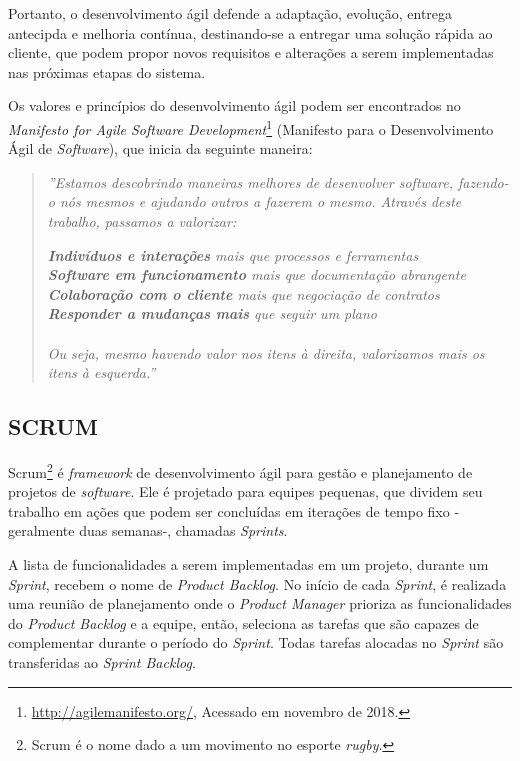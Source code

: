 Portanto, o desenvolvimento ágil defende a adaptação, evolução, entrega antecipda e melhoria contínua, destinando-se a entregar uma solução rápida ao cliente, que podem propor novos requisitos e alterações a serem implementadas nas próximas etapas do sistema.

Os valores e princípios do desenvolvimento ágil podem ser encontrados no \textit{Manifesto for Agile Software Development}\footnote{\url{http://agilemanifesto.org/}, Acessado em novembro de 2018.} (Manifesto para o Desenvolvimento Ágil de \textit{Software}), que inicia da seguinte maneira:

\begin{quote}
    \textit{''Estamos descobrindo maneiras melhores de desenvolver software, fazendo-o nós mesmos e ajudando outros a 
    fazerem o mesmo. Através deste trabalho, passamos a valorizar:}
    
        \textit{\textbf{Indivíduos e interações} mais que processos e ferramentas \\
        \textbf{Software em funcionamento} mais que documentação abrangente \\
        \textbf{Colaboração com o cliente} mais que negociação de contratos \\
        \textbf{Responder a mudanças mais} que seguir um plano \\}
        \\
        \textit{Ou seja, mesmo havendo valor nos itens à direita, valorizamos mais os itens à esquerda.''}
\end{quote}


\subsection{SCRUM}
\label{fundSWSCRUM}

Scrum\footnote{Scrum é o nome dado a um movimento no esporte \textit{rugby}.} é \textit{framework} de desenvolvimento ágil para gestão e planejamento de projetos de \textit{software}. Ele é projetado para equipes pequenas, que dividem seu trabalho em ações que podem ser concluídas em iterações de tempo fixo -geralmente duas semanas-, chamadas \textit{Sprints}. \cite{pressman}

A lista de funcionalidades a serem implementadas em um projeto, durante um \textit{Sprint}, recebem o nome de \textit{Product Backlog}. No início de cada \textit{Sprint}, é realizada uma reunião de planejamento onde o \textit{Product Manager}  prioriza as funcionalidades do \textit{Product Backlog} e a equipe, então, seleciona as tarefas que são capazes de complementar durante o período do \textit{Sprint}. Todas tarefas alocadas no \textit{Sprint} são transferidas ao \textit{Sprint Backlog}.

